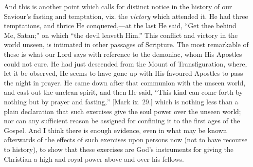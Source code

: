 And this is another point which calls for distinct notice in the
history of our Saviour's fasting and temptation, viz. the \emph{victory}
which attended it. He had three temptations, and thrice He conquered,—at
the last He said, ``Get thee behind Me, Satan;'' on which
``the devil leaveth Him.'' This conflict and victory in the
world unseen, is intimated in other passages of Scripture. The most
remarkable of these is what our Lord says with reference to the
demoniac, whom His Apostles could not cure. He had just descended from
the Mount of Transfiguration, where, let it be observed, He seems to
have gone up with His favoured Apostles to pass the night in prayer.
He came down after that communion with the unseen world, and cast out
the unclean spirit, and then He said, ``This kind can come forth
by nothing but by prayer and fasting,'' [Mark ix. 29.] which is
nothing less than a plain declaration that such exercises give the
soul power over the unseen world; nor can any sufficient reason be
assigned for confining it to the first ages of the Gospel. And I think
there is enough evidence, even in what may be known afterwards of the
effects of such exercises upon persons now (not to have recourse to
history), to show that these exercises are God's instruments for
giving the Christian a high and royal power above and over his
fellows.


